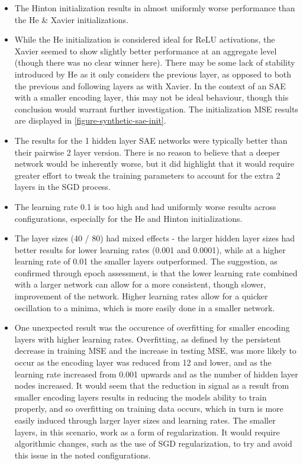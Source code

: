 \documentclass[a4paper,latin]{paper}
\begin{document}
\begin{itemize}
	\item The Hinton initialization results in almost uniformly worse performance than the He \& Xavier initializations. 
	\item While the He initialization is considered ideal for ReLU activations, the Xavier seemed to show slightly better performance at an aggregate level (though there was no clear winner here). There may be some lack of stability introduced by He as it only considers the previous layer, as opposed to both the previous and following layers as with Xavier. In the context of an SAE with a smaller encoding layer, this may not be ideal behaviour, though this conclusion would warrant further investigation. The initialization MSE results are displayed in \ref{figure-synthetic-sae-init}.
	\item The results for the 1 hidden layer SAE networks were typically better than their pairwise 2 layer version. There is no reason to believe that a deeper network would be inherently worse, but it did highlight that it would require greater effort to tweak the training parameters to account for the extra 2 layers in the SGD process.
	\item The learning rate 0.1 is too high and had uniformly worse results across configurations, especially for the He and Hinton initializations.
	\item The layer sizes (40 / 80) had mixed effects - the larger hidden layer sizes had better results for lower learning rates (0.001 and 0.0001), while at a higher learning rate of 0.01 the smaller layers outperformed. The suggestion, as confirmed through epoch assessment, is that the lower learning rate combined with a larger network can allow for a more consistent, though slower, improvement of the network. Higher learning rates allow for a quicker oscillation to a minima, which is more easily done in a smaller network.
	\item One unexpected result was the occurence of overfitting for smaller encoding layers with higher learning rates. Overfitting, as defined by the persistent decrease in training MSE and the increase in testing MSE, was more likely to occur as the encoding layer was reduced from 12 and lower, and as the learning rate increased from 0.001 upwards and as the number of hidden layer nodes increased. It would seem that the reduction in signal as a result from smaller encoding layers results in reducing the models ability to train properly, and so overfitting on training data occurs, which in turn is more easily induced through larger layer sizes and learning rates. The smaller layers, in this scenario, work as a form of regularization. It would require algorithmic changes, such as the use of SGD regularization, to try and avoid this issue in the noted configurations.
\end{itemize}
\end{document}
